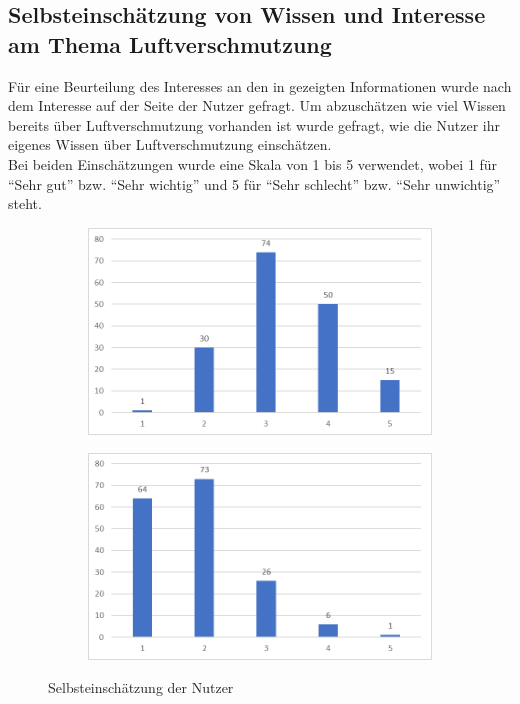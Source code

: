 \subsection{Selbsteinschätzung von Wissen und Interesse am Thema Luftverschmutzung}
Für eine Beurteilung des Interesses an den in \softwarename gezeigten Informationen wurde nach dem Interesse auf der Seite der Nutzer gefragt.
Um abzuschätzen wie viel Wissen bereits über \gls{Luftverschmutzung} vorhanden ist wurde gefragt, wie die Nutzer ihr eigenes Wissen über \gls{Luftverschmutzung} einschätzen.
\\
Bei beiden Einschätzungen wurde eine Skala von 1 bis 5 verwendet, wobei 1 für \enquote{Sehr gut} bzw. \enquote{Sehr wichtig} und 5 für \enquote{Sehr schlecht} bzw. \enquote{Sehr unwichtig} steht.
\\
\begin{figure}[h]
    \begin{subfigure}[c]{0.49\textwidth}
        \centering        
        \includegraphics[scale=0.2]{media/diagram/eigenesWissen.png}
    \end{subfigure}
    \begin{subfigure}[c]{0.49\textwidth}
        \centering        
        \includegraphics[scale=0.2]{media/diagram/WichtigkeitVonInfos.png}
    \end{subfigure}
    \caption{Selbsteinschätzung der Nutzer}
\end{figure}
